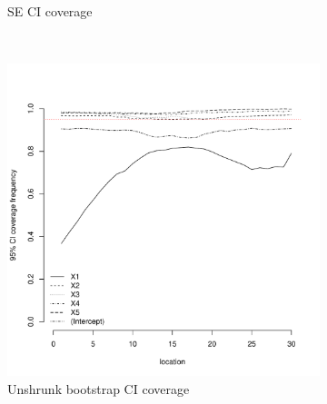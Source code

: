 \documentclass[authoryear, review, 11pt]{elsarticle}
\begin{document}
\begin{figure}
\begin{subfigure}[b]{0.45\textwidth}
		\caption{SE CI coverage}
	\end{subfigure}%
	\\%
	\begin{subfigure}[b]{0.45\textwidth}
	\centering
		\includegraphics[width=\textwidth]{../../figures/simulation/15.26.profile_unshrunk_bootstrap_coverage.pdf}
		\caption{Unshrunk bootstrap CI coverage}
	\end{subfigure}%
	~ %
	\begin{subfigure}[b]{0.45\textwidth}
	\centering

\end{subfigure}
\end{figure}
\end{document}
